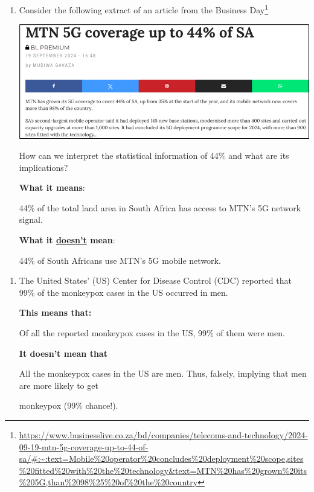 \documentclass[
]{book}
\begin{document}
\begin{enumerate}
\def\labelenumi{\arabic{enumi}.}
\item
  Consider the following extract of an article from the Business Day\footnote{\url{https://www.businesslive.co.za/bd/companies/telecoms-and-technology/2024-09-19-mtn-5g-coverage-up-to-44-of-sa/\#:~:text=Mobile\%20operator\%20concludes\%20deployment\%20scope,sites\%20fitted\%20with\%20the\%20technology&text=MTN\%20has\%20grown\%20its\%205G,than\%2098\%25\%20of\%20the\%20country}}

  \includegraphics[width=5.20833in,height=\textheight]{images/clipboard-338848850.png}

  How can we interpret the statistical information of 44\% and what are its implications?

  \textbf{What it means}:

  44\% of the total land area in South Africa has access to MTN's 5G network signal.

  \textbf{What it \ul{doesn't} mean}:

  44\% of South Africans use MTN's 5G mobile network.
\end{enumerate}

\begin{enumerate}
\def\labelenumi{\arabic{enumi}.}
\setcounter{enumi}{1}
\item
  The United States' (US) Center for Disease Control (CDC) reported that 99\% of the monkeypox cases in the US occurred in men.

  \textbf{This means that:}

  Of all the reported monkeypox cases in the US, 99\% of them were men.

  \textbf{It doesn't mean that}

  All the monkeypox cases in the US are men. Thus, falsely, implying that men are more likely to get

  monkeypox (99\% chance!).
\end{enumerate}
\end{document}
